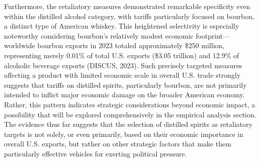 \documentclass[AEJ]{AEA}
\begin{document}
	Furthermore, the retaliatory measures demonstrated remarkable specificity even within the distilled alcohol category, with tariffs particularly focused on bourbon, a distinct type of American whiskey. This heightened selectivity is especially noteworthy considering bourbon's relatively modest economic footprint—worldwide bourbon exports in 2023 totaled approximately \$250 million, representing merely 0.01\% of total U.S. exports (\$3.05 trillion) and 12.9\% of alcoholic beverage exports (DISCUS, 2023). Such precisely targeted measures affecting a product with limited economic scale in overall U.S. trade strongly suggests that tariffs on distilled spirits, particularly bourbon, are not primarily intended to inflict major economic damage on the broader American economy. Rather, this pattern indicates strategic considerations beyond economic impact, a possibility that will be explored comprehensively in the empirical analysis section. The evidence thus far suggests that the selection of distilled spirits as retaliatory targets is not solely, or even primarily, based on their economic importance in overall U.S. exports, but rather on other strategic factors that make them particularly effective vehicles for exerting political pressure.
	
	
	
	
	
\end{document}
